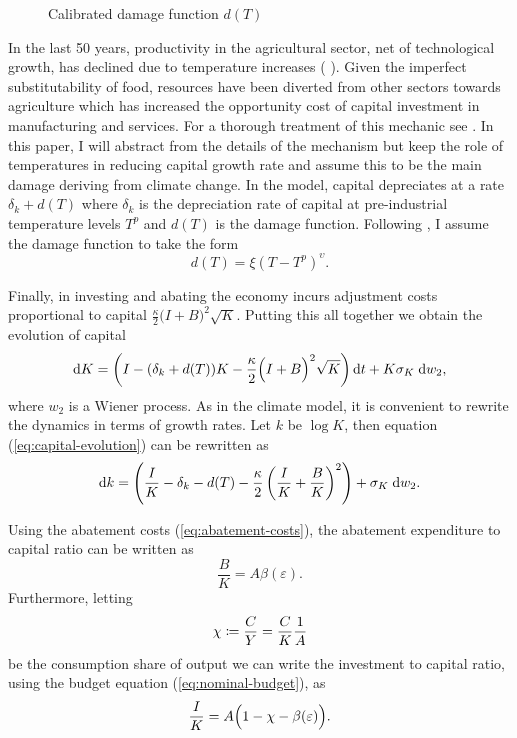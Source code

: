 \documentclass[../../main.tex]{subfiles}
\begin{document}
\begin{wrapfigure}{r}{0.5\textwidth}
    \centering
    \caption{Calibrated damage function $d(T)$}
    \label{fig:damage}
\end{wrapfigure}In the last 50 years, productivity in the agricultural sector, net of technological growth, has declined due to temperature increases (\citeauthor{dell_temperature_2009} \citeyear{dell_temperature_2009}). Given the imperfect substitutability of food, resources have been diverted from other sectors towards agriculture which has increased the opportunity cost of capital investment in manufacturing and services. For a thorough treatment of this mechanic see \cite{dietz_growth_2019}. In this paper, I will abstract from the details of the mechanism but keep the role of temperatures in reducing capital growth rate and assume this to be the main damage deriving from climate change. In the model, capital depreciates at a rate $\delta_k +  d(T) $ where $\delta_k$ is the depreciation rate of capital at pre-industrial temperature levels $T^p$ and $d(T)$ is the damage function. Following \cite{weitzman_ghg_2012}, I assume the damage function to take the form \begin{equation}
    d(T) = \xi (T - T^p)^{\upsilon}.
\end{equation} 

Finally, in investing and abating the economy incurs adjustment costs proportional to capital $\frac{\kappa}{2} \big(I + B \big)^2 \sqrt{K}$. Putting this all together we obtain the evolution of capital \begin{equation} \label{eq:capital-evolution}
    \mathrm{d}K = \left( I - (\delta_k + d(T)) K - \frac{\kappa}{2} \Big(I + B\Big)^2 \sqrt{K} \right) \mathrm{d}t + K \sigma_K \; \mathrm{d}w_2,
\end{equation} where $w_2$ is a Wiener process. As in the climate model, it is convenient to rewrite the dynamics in terms of growth rates. Let $k$ be $\log K$, then equation (\ref{eq:capital-evolution}) can be rewritten as \begin{equation} \label{eq:capital-evolution:log:level}
    \text{d}k = \left( \frac{I}{K} - \delta_k - d(T) - \frac{\kappa}{2} \left(\frac{I}{K} + \frac{B}{K}\right)^2 \right) + \sigma_K \; \mathrm{d}w_2.
\end{equation}

Using the abatement costs (\ref{eq:abatement-costs}), the abatement expenditure to capital ratio can be written as \begin{equation}
    \frac{B}{K} = A \beta(\varepsilon).
\end{equation} Furthermore, letting \begin{equation}
    \chi \coloneqq \frac{C}{Y} = \frac{C}{K} \frac{1}{A}
\end{equation} be the consumption share of output we can write the investment to capital ratio, using the budget equation (\ref{eq:nominal-budget}), as \begin{equation}
    \frac{I}{K} = A \Big(1 - \chi - \beta(\varepsilon)\Big).
\end{equation}
\end{document}
